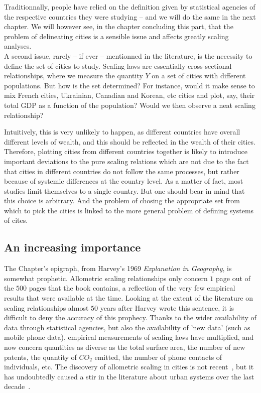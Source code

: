 Traditionnally, people have relied on the definition given by statistical
agencies of the respective countries they were studying -- and we will do the
same in the next chapter. We will however see, in the chapter concluding this
part, that the problem of delineating cities is a sensible issue and affects
greatly scaling analyses. \\


A second issue, rarely -- if ever -- mentionned in the literature, is the
necessity to define the set of cities to study. Scaling laws are essentially
cross-sectional relationships, where we measure the quantity $Y$ on a set of
cities with different populations. But how is the set determined? For instance,
would it make sense to mix French cities, Ukrainian, Canadian and Korean, etc
cities and plot, say, their total GDP as a function of the population? Would we
then observe a neat scaling relationship? 

Intuitively, this is very unlikely to happen, as different countries have
overall different levels of wealth, and this should be reflected in the wealth
of their cities. Therefore, plotting cities from different countries together is
likely to introduce important deviations to the pure scaling relations which are
not due to the fact that cities in different countries do not follow the same
processes, but rather because of systemic differences at the country level. As a
matter of fact, most studies limit themselves to a single country. But one should
bear in mind that this choice is arbitrary. And the problem of chosing
the appropriate set from which to pick the cities is linked to the more general
problem of defining systems of cites.


\subsection{An increasing importance}
\label{sub:an_increasing_place_in_the_landscape}


The Chapter's epigraph, from Harvey's 1969
\emph{Explanation in Geography}, is somewhat prophetic.  Allometric scaling
relationships only concern $1$ page out of the $500$ pages that the book
contains, a reflection of the very few empirical results that were available at
the time.  Looking at the extent of the literature on scaling relationships
almost $50$ years after Harvey wrote this sentence, it is difficult to deny the
accuracy of this prophecy. Thanks to the wider availability of data through
statistical agencies, but also the availability of 'new data' (such as mobile
phone data), empirical measurements of scaling laws have multiplied, and now
concern quantities as diverse as the total surface area, the number of new patents,
the quantity of $CO_2$ emitted, the number of phone contacts of individuals, etc. 
The discovery of allometric scaling in cities is not recent~\cite{Stewart:1947},
but it has undoubtedly caused a stir in the literature about urban systems over
the last
decade~\cite{Bettencourt:2007,Pumain:2004,Bettencourt:2013,Louf:2014_scaling,Louf:2014_smog,Arcaute:2014}.\\


